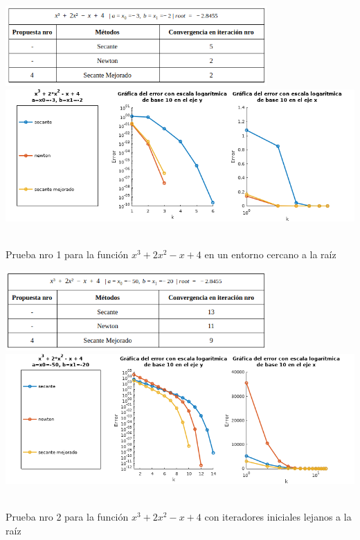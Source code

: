\documentclass[11pt]{article}
\begin{document}
\begin{center}
    \includegraphics[keepaspectratio, width=10cm]{T1.png}
    \vspace{0.5cm}
    \includegraphics[keepaspectratio, width=14cm]{CL1.png}
    \caption \tiny{\\ Prueba nro 1 para la función $x^3 + 2x^2 - x + 4$ en un entorno cercano a la raíz}
    

\end{center}  
\vspace{0.75cm}


\begin{center}
    \includegraphics[keepaspectratio, width=10cm]{T2.png}
    \vspace{0.5cm}
    \includegraphics[keepaspectratio, width=14cm]{CL2.png}
     \caption \tiny{\\ Prueba nro 2 para la función $x^3 + 2x^2 - x + 4$ con iteradores iniciales lejanos a la raíz}

\end{center} 
\vspace{0.75cm}
\end{document}
